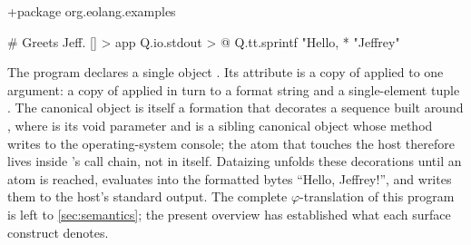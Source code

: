 \begin{ffcode}
+package org.eolang.examples

# Greets Jeff.
[] > app
  Q.io.stdout > @
    Q.tt.sprintf
      "Hello, %
      * "Jeffrey"
\end{ffcode}

The program declares a single object .
Its  attribute is a copy of  applied to one
  argument: a copy of  applied in turn to a format
  string and a single-element tuple .
The canonical  object is itself a formation that decorates
  a sequence built around , where  is
  its void parameter and  is a sibling canonical object
  whose  method writes to the operating-system console;
  the atom that touches the host therefore lives inside 's
  call chain, not in  itself.
Dataizing  unfolds these decorations until an atom is reached,
  evaluates  into the formatted bytes
  \enquote{Hello, Jeffrey!}, and writes them to the host's standard
  output.
The complete \(\varphi\)-translation of this program is left to
  \cref{sec:semantics}; the present overview has established what each
  surface construct denotes.
